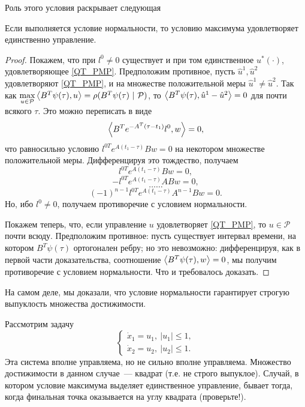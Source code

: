 Роль этого условия раскрывает следующая
\begin{theorem}
  Если выполняется условие нормальности,
  то условию максимума удовлетворяет единственно управление.
\end{theorem}
\begin{proof}
  Покажем, что при $l^0 \neq 0$ существует и при том
  единственное $u^*(\cdot)$, удовлетворяющее \eqref{QT_PMP}.
  Предположим противное,
  пусть $\hat{u}^1, \hat{u}^2$ удовлетворяют \eqref{QT_PMP},
  и на множестве положительной меры $\hat{u}^1 \neq \hat{u}^2$.
  Так как 
  $
    \max\limits_{u\in\mathcal{P}}\left<B^T\psi(\tau),u\right> =
    \rho(B^T\psi(\tau)\ |\ \mathcal{P})
  $, то
  $\left<B^T\psi(\tau),\hat{u}^1 - \hat{u}^2\right> = 0$
  для почти всякого $\tau$.
  Это можно переписать в виде
  $$
    \left<B^Te^{-A^T(\tau - t_1)}l^0,w\right> = 0,
  $$ что равносильно условию
  $l^{0T}e^{A(t_1 - \tau)}Bw = 0$ на некотором множестве
  положительной меры. Дифференцируя это тождество, получаем
  $$
    l^{0T}e^{A(t_1 - \tau)}Bw = 0,
  $$
  $$
    -l^{0T}e^{A(t_1 - \tau)}ABw = 0,
  $$
  $$
    \ldots \ldots
  $$
  $$
    (-1)^{n-1}l^{0T}e^{A(t_1 - \tau)}A^{n - 1}Bw = 0.
  $$
  Но, ибо $l^0 \neq 0$,
  получаем противоречие с условием нормальности.

  Покажем теперь, что, если управление $u$ удовлетворяет \eqref{QT_PMP},
  то $u \in \mathcal{P}$ почти всюду.
  Предположим противное: пусть существует интервал времени,
  на котором $B^T\psi(\tau)$ ортогонален ребру;
  но это невозможно: дифференцируя,
  как в первой части доказательства,
  соотношение $\left<B^T\psi(\tau),w\right> = 0$,
  мы получим противоречие с условием нормальности.
  Что и требовалось доказать.
\end{proof}
\begin{note}
  На самом деле, мы доказали,
  что условие нормальности гарантирует
  строгую выпуклость множества достижимости.
\end{note}
\begin{ex}
  Рассмотрим задачу
  $$
    \begin{cases}
      \dot{x}_1 = u_1,\ |u_1|\leqslant 1,\\
      \dot{x}_2 = u_2,\ |u_2|\leqslant1.
    \end{cases}
  $$
  Эта система вполне управляема, но не сильно вполне управляема.
  Множество достижимости в данном
  случае~--- квадрат (т.е. не строго выпуклое).
  Случай, в котором условие
  максимума выделяет единственное управление,
  бывает тогда, когда финальная точка
  оказывается на углу квадрата (проверьте!).
\end{ex}
